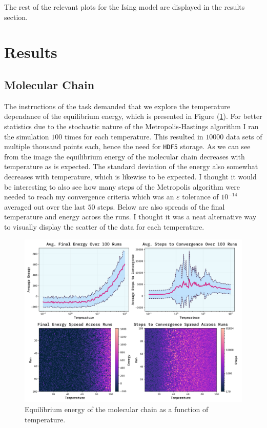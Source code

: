 \documentclass[10pt, titlepage, a4paper]{article}
\begin{document}
The rest of the relevant plots for the Ising model are displayed in the results section.

\section{Results}
\subsection{Molecular Chain}
The instructions of the task demanded that we explore the temperature dependance of the equilibrium energy, which is presented in Figure 
(\ref{fig:molecular-energy}). For better statistics due to the stochastic nature of the Metropolis-Hastings algorithm I ran the simulation
$100$ times for each temperature. This resulted in $10000$ data sets of multiple thousand points each, hence the need for \texttt{HDF5} storage.
As we can see from the image the equilibrium energy of the molecular chain decreases with temperature as is expected. The standard deviation 
of the energy also somewhat decreases with temperature, which is likewise to be expected. I thought it would be interesting to also see how many 
steps of the Metropolis algorithm were needed to reach my convergence criteria which was an $\varepsilon$ tolerance of $10^{-14}$ averaged out 
over the last $50$ steps. Below are also spreads of the final temperature and energy across the runs. I thought it was a neat alternative way 
to visually display the scatter of the data for each temperature.

\begin{figure}[H]
    \centering
    \includegraphics[width=.95\textwidth]{../MolecularChain2/Images/avgE-vs-T.png}
    \caption{Equilibrium energy of the molecular chain as a function of temperature.}
    \label{fig:molecular-energy}
\end{figure}
\end{document}
